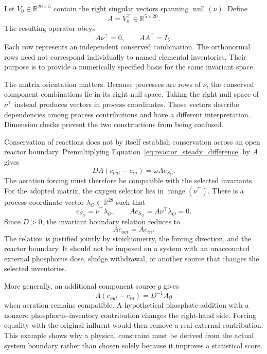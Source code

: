 Let $V_0\in\mathbb{R}^{20\times5}$ contain the right singular vectors spanning $\operatorname{null}(\nu)$. Define
\begin{equation}
A=V_0^\top\in\mathbb{R}^{5\times20}.
\label{eq:invariant_basis_definition}
\end{equation}
The resulting operator obeys
\begin{equation}
A\nu^\top=0,\qquad AA^\top=I_5.
\label{eq:invariant_basis_properties}
\end{equation}
Each row represents an independent conserved combination. The orthonormal rows need not correspond individually to named elemental inventories. Their purpose is to provide a numerically specified basis for the same invariant space.

The matrix orientation matters. Because processes are rows of $\nu$, the conserved component combinations lie in its right null space. Taking the right null space of $\nu^\top$ instead produces vectors in process coordinates. Those vectors describe dependencies among process contributions and have a different interpretation. Dimension checks prevent the two constructions from being confused.

Conservation of reactions does not by itself establish conservation across an open reactor boundary. Premultiplying Equation~\eqref{eq:reactor_steady_difference} by $A$ gives
\begin{equation}
D A(c_{out}-c_{in})=\omega A e_{S_O}.
\label{eq:invariant_boundary_balance}
\end{equation}
The aeration forcing must therefore be compatible with the selected invariants. For the adopted matrix, the oxygen selector lies in $\operatorname{range}(\nu^\top)$. There is a process-coordinate vector $\lambda_O\in\mathbb{R}^{28}$ such that
\begin{equation}
e_{S_O}=\nu^\top\lambda_O,\qquad
Ae_{S_O}=A\nu^\top\lambda_O=0.
\label{eq:oxygen_forcing_compatibility}
\end{equation}
Since $D>0$, the invariant boundary relation reduces to
\begin{equation}
Ac_{out}=Ac_{in}.
\label{eq:reactor_invariant_equality}
\end{equation}
The relation is justified jointly by stoichiometry, the forcing direction, and the reactor boundary. It should not be imposed on a system with an unaccounted external phosphorus dose, sludge withdrawal, or another source that changes the selected inventories.

More generally, an additional component source $g$ gives
\begin{equation}
A(c_{out}-c_{in})=D^{-1}Ag
\label{eq:general_invariant_source}
\end{equation}
when aeration remains compatible. A hypothetical phosphate addition with a nonzero phosphorus-inventory contribution changes the right-hand side. Forcing equality with the original influent would then remove a real external contribution. This example shows why a physical constraint must be derived from the actual system boundary rather than chosen solely because it improves a statistical score.

